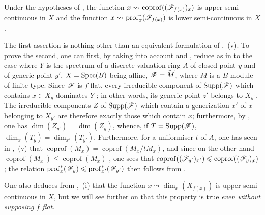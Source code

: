 \begin{corollary}[12.1.3]
\label{IV.12.1.3}
Under the hypotheses of , the function $x\leadsto\operatorname{coprof}((\mathscr{F}_{f(x)})_x)$ is upper semi-continuous in $X$ and the function $x\leadsto\operatorname{prof}_x^*(\mathscr{F}_{f(x)})$  is lower semi-continuous in $X$.
\end{corollary}

The first assertion is nothing other than an equivalent formulation of ,~(v).
To prove the second, one can first, by taking into account  and , reduce as in  to the case where $Y$ is the spectrum of a discrete valuation ring $A$ of closed point $y$ and of generic point $y'$, $X=\operatorname{Spec}(B)$ being affine, $\mathscr{F}=\widetilde{M}$, where $M$ is a $B$-module of finite type.
Since $\mathscr{F}$ is $f$-flat, every irreducible component of $\operatorname{Supp}(\mathscr{F})$ which contains $x\in X_y$ dominates $Y$ ; in other words, its generic point $z'$ belongs to $X_{y'}$. The irreducible components $Z$ of $\operatorname{Supp}(\mathscr{F})$ which contain a generization $x'$ of $x$ belonging to $X_{y'}$ are therefore exactly those which contain $x$; furthermore, by , one has $\dim(Z_{y'})=\dim(Z_y)$, whence, if $T=\operatorname{Supp}(\mathscr{F})$, $\dim_x(T_y)=\dim_{x'}(T_{y'})$.
Furthermore, for a uniformiser $t$ of $A$, one has seen in ,~(v) that $\operatorname{coprof}(M_x)=\operatorname{coprof}(M_x/tM_x)$, and since on the other hand $\operatorname{coprof}(M_{x'})\leqslant\operatorname{coprof}(M_x)$ , one sees that $\operatorname{coprof}((\mathscr{F}_{y'})_{x'})\leqslant\operatorname{coprof}((\mathscr{F}_y)_x)$; the relation $\operatorname{prof}_x^*(\mathscr{F}_y)\leqslant\operatorname{prof}_{x'}^*(\mathscr{F}_{y'})$ then follows from .

\begin{remark}[12.1.4]
\label{IV.12.1.4}
One also deduces from ,~(i) that the function $x\leadsto\dim_x(X_{f(x)})$ is upper semi-continuous in $X$, but we will see further on  that this property is true \emph{even without supposing $f$ flat}.
\end{remark}

